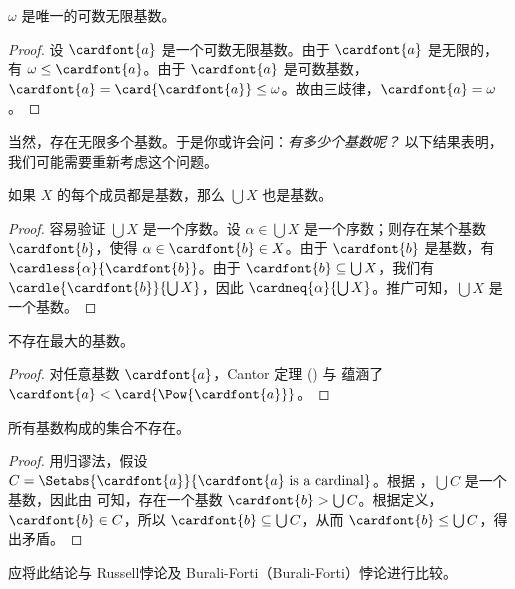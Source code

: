 \documentclass[../../../include/open-logic-section]{subfiles}
\begin{document}
\begin{cor}
$\omega$ 是唯一的可数无限基数。
\end{cor}

\begin{proof}
设 $\cardfont{a}$ 是一个可数无限基数。由于 $\cardfont{a}$ 是无限的，有 $\omega \leq \cardfont{a}$。由于 $\cardfont{a}$ 是可数基数，$\cardfont{a} =
\card{\cardfont{a}} \leq \omega$。故由三歧律，$\cardfont{a} = \omega$。
\end{proof}

当然，存在无限多个基数。于是你或许会问：\emph{有多少个基数呢？} 以下结果表明，我们可能需要重新考虑这个问题。

\begin{prop}
如果 $X$ 的每个成员都是基数，那么 $\bigcup X$ 也是基数。
\end{prop}

\begin{proof}
容易验证 $\bigcup X$ 是一个序数。设 $\alpha \in \bigcup X$ 是一个序数；则存在某个基数 $\cardfont{b}$，使得 $\alpha \in \cardfont{b} \in X$。由于 $\cardfont{b}$ 是基数，有 $\cardless{\alpha}{\cardfont{b}}$。由于 $\cardfont{b} \subseteq \bigcup X$，我们有 $\cardle{\cardfont{b}}{\bigcup X}$，因此 $\cardneq{\alpha}{\bigcup X}$。推广可知，$\bigcup X$ 是一个基数。
\end{proof}

\begin{thm}
不存在最大的基数。
\end{thm}

\begin{proof}
对任意基数 $\cardfont{a}$，Cantor 定理 () 与  蕴涵了 $\cardfont{a} < \card{\Pow{\cardfont{a}}}$。
\end{proof}

\begin{thm}
所有基数构成的集合不存在。
\end{thm}

\begin{proof}
用归谬法，假设 $C = \Setabs{\cardfont{a}}{\cardfont{a} \text{
is a cardinal}}$。根据 ，$\bigcup C$ 是一个基数，因此由  可知，存在一个基数 $\cardfont{b} > \bigcup C$。根据定义，$\cardfont{b} \in C$，所以 $\cardfont{b} \subseteq \bigcup{C}$，从而 $\cardfont{b} \leq \bigcup C$，得出矛盾。
\end{proof}

应将此结论与 Russell悖论及 Burali-Forti（Burali-Forti）悖论进行比较。
\end{document}
